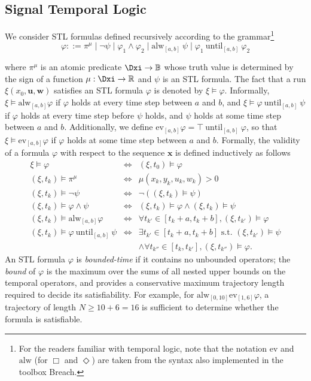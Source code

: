 \documentclass[hyperref, xcolor=dvipsnames, 10pt]{article} %
\def \x {\mathbf{x}}
\def \u {\mathbf{u}}
\def \w {\mathbf{w}}
\def \f {\varphi}
\def\Reals {\mathbb{R}}
\def\G {\text{alw}}
\def\F {\text{ev}}
\def\until {\text{until}}
\begin{document}
\subsection{Signal Temporal Logic}
We consider STL formulas defined recursively according to the grammar\footnote{For the readers
  familiar with temporal logic, note that the notation $\F$ and $\G$ (for $\Box$ and $\Diamond$) are
  taken from the syntax also implemented in the toolbox Breach.}
$$
\f ::= \pi^\mu \mid \neg \psi \mid \f_1 \land \f_2 \mid \G_{[a,b]}~\psi \mid \f_1~\until_{[a,b]}~\f_2
$$

 where $\pi^\mu$ is an atomic predicate $\Dxi \rightarrow \mathbb{B}$ whose truth value is
determined by the sign of a function $\mu: \Dxi \rightarrow \Reals$ and $\psi$ is an STL
formula. The fact that a run $\xi(x_0, \u,\w)$ satisfies an STL formula $\f$ is denoted by
$\xi \models \f$. Informally, $\xi \models \G_{[a,b]} \f$ if
$\f$ holds at every time step between $a$ and $b$, and
$\xi \models \f~\until_{[a,b]}~\psi$ if $\f$ holds at every time step before $\psi$
holds, and $\psi$ holds at some time step between $a$ and $b$. Additionally, we define
$\F_{[a,b]}\f = \top~\until_{[a,b]}~\f$, so that $\xi \models \F_{[a,b]} \f$ if
$\f$ holds at some time step between $a$ and $b$. Formally, the validity of a formula $\f$ with
respect to the sequence $\x$ is defined inductively
as follows
\[
\begin{array}{lll}
\xi \models \f & \Leftrightarrow& (\xi,t_0) \models \f\\
(\xi,t_k) \models\pi^\mu &\Leftrightarrow& \mu(x_k,y_k,u_k,w_k) > 0\\
(\xi,t_k) \models \neg \psi &\Leftrightarrow& \neg((\xi,t_k) \models \psi)\\
(\xi,t_k) \models \f \land \psi &\Leftrightarrow& (\xi,t_k) \models \f \land (\xi,t_k) \models \psi\\
(\xi,t_k) \models \G_{[a,b]} \f &\Leftrightarrow& \forall t_{k'}\in [t_k\!+\!a, t_k\!+\!b], (\xi,t_{k'}) \models \f\\
 (\xi,t_k) \models \f~\until_{[a,b]}~\psi &\Leftrightarrow& \exists t_{k'} \in [t_k\!+\!a,t_k\!+\!b] \mbox{ s.t. } (\xi,t_{k'}) \models \psi \\
&&\land \forall t_{k''} \in [t_{k},t_{k'}], (\xi,t_{k''}) \models \f.
\end{array}
\]
An STL formula $\f$ is \emph{bounded-time} if it contains no unbounded operators; the
\emph{bound} of $\f$ is the maximum over the sums of all nested upper bounds on the temporal
operators, and provides a conservative maximum trajectory length required to decide its
satisfiability. For example, for $\G_{[0,10]} \F_{[1,6]} \f$, a trajectory of length
$N \ge 10 + 6 = 16$ is sufficient to determine whether the formula is satisfiable. 
\end{document}
